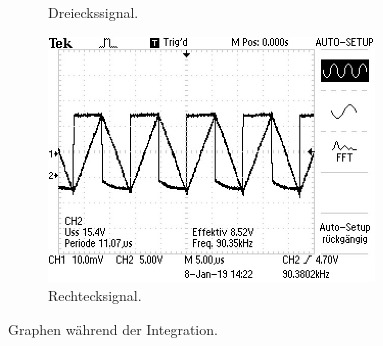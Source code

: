 \begin{figure}
\begin{subfigure}{0.32\textwidth}
        \caption{Dreieckssignal.}
        \label{fig:dreieck}
    \end{subfigure}
    \begin{subfigure}{0.32\textwidth}
        \centering
        \includegraphics[width=0.95\textwidth]{content/rechteck.jpg}
        \caption{Rechtecksignal.}
        \label{fig:rechteck}
    \end{subfigure}
    \caption{Graphen während der Integration.}
    \label{fig:integration}
\end{figure}